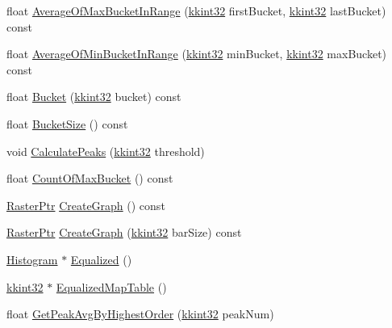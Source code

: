 \begin{DoxyCompactItemize}
float \hyperlink{class_k_k_b_1_1_histogram_ac0d1890f4e8826a2f7a217ecfbf76c59}{Average\+Of\+Max\+Bucket\+In\+Range} (\hyperlink{namespace_k_k_b_a8fa4952cc84fda1de4bec1fbdd8d5b1b}{kkint32} first\+Bucket, \hyperlink{namespace_k_k_b_a8fa4952cc84fda1de4bec1fbdd8d5b1b}{kkint32} last\+Bucket) const 
\item 
float \hyperlink{class_k_k_b_1_1_histogram_adace35b6a2076563aacf43f4de6c41b4}{Average\+Of\+Min\+Bucket\+In\+Range} (\hyperlink{namespace_k_k_b_a8fa4952cc84fda1de4bec1fbdd8d5b1b}{kkint32} min\+Bucket, \hyperlink{namespace_k_k_b_a8fa4952cc84fda1de4bec1fbdd8d5b1b}{kkint32} max\+Bucket) const 
\item 
float \hyperlink{class_k_k_b_1_1_histogram_a1fb293678e0e91e1f4fc5cc18d11f62b}{Bucket} (\hyperlink{namespace_k_k_b_a8fa4952cc84fda1de4bec1fbdd8d5b1b}{kkint32} bucket) const 
\item 
float \hyperlink{class_k_k_b_1_1_histogram_a7cf220be1ecaf49901f6afea550c6015}{Bucket\+Size} () const 
\item 
void \hyperlink{class_k_k_b_1_1_histogram_a1dcb39e4363db00133b3f95a7f25e45c}{Calculate\+Peaks} (\hyperlink{namespace_k_k_b_a8fa4952cc84fda1de4bec1fbdd8d5b1b}{kkint32} threshold)
\item 
float \hyperlink{class_k_k_b_1_1_histogram_a99ebe30e504bc5a78469cdf0f7963820}{Count\+Of\+Max\+Bucket} () const 
\item 
\hyperlink{namespace_k_k_b_a80d46bd24db644a022c863bce8ae3633}{Raster\+Ptr} \hyperlink{class_k_k_b_1_1_histogram_a5305305682f7b1dcb4e575550e94dce3}{Create\+Graph} () const 
\item 
\hyperlink{namespace_k_k_b_a80d46bd24db644a022c863bce8ae3633}{Raster\+Ptr} \hyperlink{class_k_k_b_1_1_histogram_a07fd97097cde777d82a8a3a97d1c4646}{Create\+Graph} (\hyperlink{namespace_k_k_b_a8fa4952cc84fda1de4bec1fbdd8d5b1b}{kkint32} bar\+Size) const 
\item 
\hyperlink{class_k_k_b_1_1_histogram}{Histogram} $\ast$ \hyperlink{class_k_k_b_1_1_histogram_a04cec38d98986864dbda4bf5b814711a}{Equalized} ()
\item 
\hyperlink{namespace_k_k_b_a8fa4952cc84fda1de4bec1fbdd8d5b1b}{kkint32} $\ast$ \hyperlink{class_k_k_b_1_1_histogram_a4aef03098feeca2316d2d8ea7862e1fe}{Equalized\+Map\+Table} ()
\item 
float \hyperlink{class_k_k_b_1_1_histogram_aa48c9389a38359e2923608a6a30e681d}{Get\+Peak\+Avg\+By\+Highest\+Order} (\hyperlink{namespace_k_k_b_a8fa4952cc84fda1de4bec1fbdd8d5b1b}{kkint32} peak\+Num)
\item 

\end{DoxyCompactItemize}
